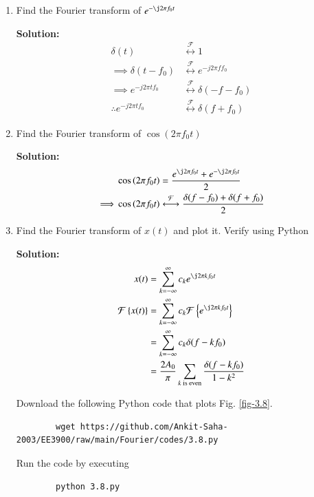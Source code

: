 \documentclass[journal,12pt,twocolumn]{IEEEtran}
\newcommand{\solution}{\noindent \textbf{Solution: }}
\providecommand{\brak}[1]{\ensuremath{\left(#1\right)}}
\providecommand{\cbrak}[1]{\ensuremath{\left\{#1\right\}}}
\providecommand{\der}[1]{\mathrm{d} #1}
\providecommand{\system}[1]{\overset{\mathcal{#1}}{ \longleftrightarrow}}
\numberwithin{equation}{section}
\numberwithin{figure}{section}
\renewcommand\thesection{\arabic{section}}
\begin{document}
\begin{enumerate}[label=\thesection.\arabic*,ref=\thesection.\theenumi]
	\solution 
	\begin{align}
		\delta(t)\system{F} &\int_{-\infty}^{\infty}\delta(t)e^{-j2\pi ft}\,\der{t} \\
		=& \left. e^{-j2\pi ft} \right|_{t=0} \\
		=& 1
	\end{align}
	
	\item Find the Fourier transform of $e^{-\j2\pi f_0 t}$
	
	\solution 
	\begin{align}
		\delta(t) &\system{F} 1 \\
		\implies \delta(t-f_0) &\system{F} e^{-j2\pi ff_0} \\
		\implies e^{-j2\pi tf_0} &\system{F} \delta(-f-f_0) \\
		\therefore e^{-j2\pi tf_0} &\system{F} \delta(f+f_0)
	\end{align}
	
	\item Find the Fourier transform of $\cos\brak{2\pi f_0 t}$
	
	\solution 
	\begin{align}
		&\cos\brak{2\pi f_0 t} = \frac{e^{\j2\pi f_0 t} + e^{-\j2\pi f_0 t}}{2} \\
		\implies &\cos\brak{2\pi f_0 t} \system{F} \frac{\delta(f-f_0) + \delta(f+f_0)}{2}
	\end{align}

	\item Find the Fourier transform of $x(t)$ and plot it. Verify using Python

	\solution 
	\begin{align}
		x(t) &= \sum_{k=-\infty}^\infty c_k e^{\j 2\pi kf_0t} \\
		\mathcal{F}\cbrak{x(t)} &= \sum_{k=-\infty}^\infty c_k \mathcal{F}\cbrak{e^{\j 2\pi kf_0t}} \\
		&= \sum_{k=-\infty}^\infty c_k \delta(f-kf_0) \\
		&= \frac{2A_0}{\pi} \sum_{k \text{ is even}} \frac{\delta(f-kf_0)}{1-k^2}
	\end{align}
	
	Download the following Python code that plots Fig. \ref{fig-3.8}.
	\begin{lstlisting}
		wget https://github.com/Ankit-Saha-2003/EE3900/raw/main/Fourier/codes/3.8.py
	\end{lstlisting}
	
	Run the code by executing
	\begin{lstlisting}
		python 3.8.py
	\end{lstlisting}


\end{enumerate}
\end{document}
